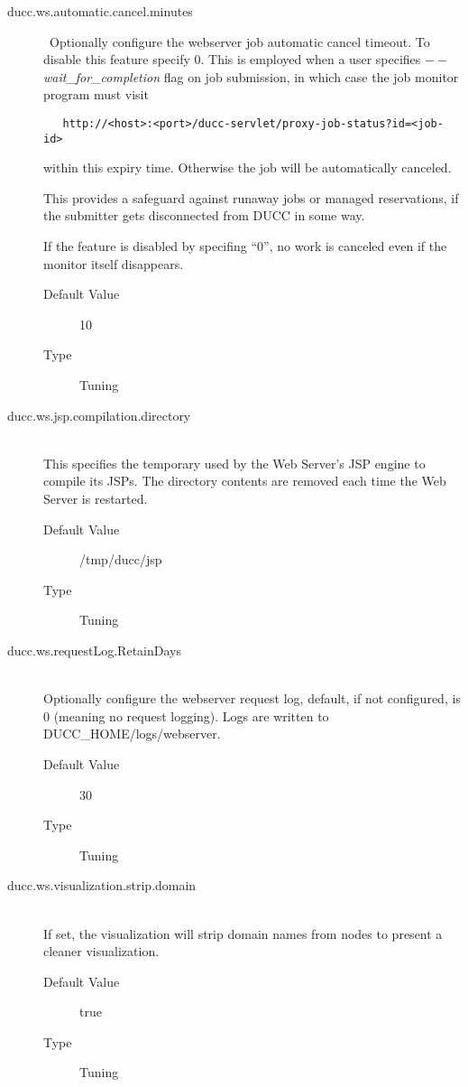 \begin{description}
        \item[ducc.ws.automatic.cancel.minutes] \hfill \ Optionally configure the webserver job
          automatic cancel timeout. To disable this feature specify 0.  This is employed when a user
          specifies {\em$--$wait\_for\_completion} flag on job submission, in which case the job
          monitor program must visit 
\begin{verbatim}
   http://<host>:<port>/ducc-servlet/proxy-job-status?id=<job-id>
\end{verbatim}
          within this expiry time.  Otherwise the job will be automatically canceled.

          This provides a safeguard against runaway jobs or managed reservations, if the
          submitter gets disconnected from DUCC in some way.

          If the feature is disabled by specifing ``0'', no work is canceled even if the
          monitor itself disappears.

          \begin{description}
            \item[Default Value] 10
            \item[Type] Tuning
          \end{description}

        \item[ducc.ws.jsp.compilation.directory] \hfill \\
          This specifies the temporary used by the Web Server's JSP engine to compile its JSPs.
          The directory contents are removed each time the Web Server is restarted.
          \begin{description}
            \item[Default Value] /tmp/ducc/jsp
            \item[Type] Tuning
          \end{description}

        \item[ducc.ws.requestLog.RetainDays] \hfill \\
          Optionally configure the webserver request log, default, if not configured, is 0 (meaning no request logging).
          Logs are written to DUCC\_HOME/logs/webserver.
          \begin{description}
            \item[Default Value] 30
            \item[Type] Tuning
          \end{description}

        \item[ducc.ws.visualization.strip.domain] \hfill \\
          If set, the visualization will strip domain names from nodes to present a cleaner visualization.
          \begin{description}
            \item[Default Value] true
            \item[Type] Tuning
          \end{description}

      \end{description}  
            
